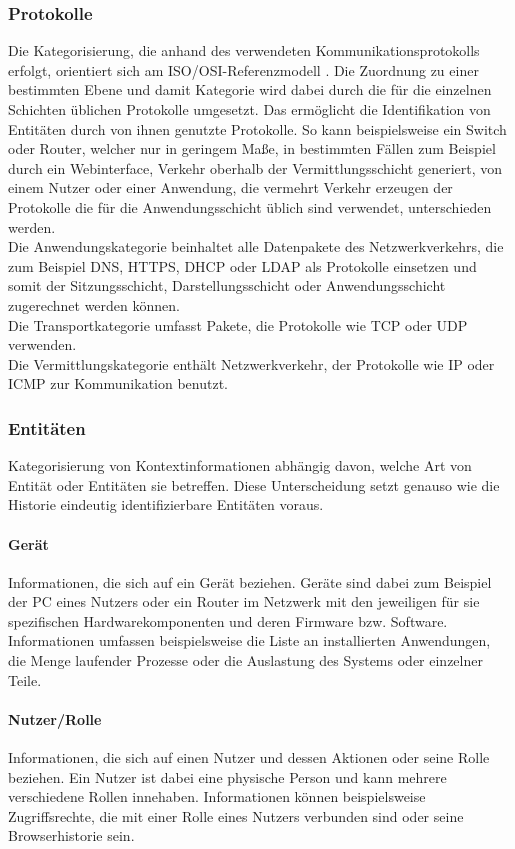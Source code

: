 \subsubsection{Protokolle}
Die Kategorisierung, die anhand des verwendeten Kommunikationsprotokolls erfolgt, orientiert sich am ISO/OSI-Referenzmodell \cite{day1983osi}. Die Zuordnung zu einer bestimmten Ebene und damit Kategorie wird dabei durch die für die einzelnen Schichten üblichen Protokolle umgesetzt. Das ermöglicht die Identifikation von Entitäten durch von ihnen genutzte Protokolle. So kann beispielsweise ein Switch oder Router, welcher nur in geringem Maße, in bestimmten Fällen zum Beispiel durch ein Webinterface, Verkehr oberhalb der Vermittlungsschicht generiert, von einem Nutzer oder einer Anwendung, die vermehrt Verkehr erzeugen der Protokolle die für die Anwendungsschicht üblich sind verwendet, unterschieden werden.\\Die Anwendungskategorie beinhaltet alle Datenpakete des Netzwerkverkehrs, die zum Beispiel DNS, HTTPS, DHCP oder LDAP als Protokolle einsetzen und somit der Sitzungsschicht, Darstellungsschicht oder Anwendungsschicht zugerechnet werden können.\\Die Transportkategorie umfasst Pakete, die Protokolle wie TCP oder UDP verwenden.\\Die Vermittlungskategorie enthält Netzwerkverkehr, der Protokolle wie IP oder ICMP zur Kommunikation benutzt.
\subsubsection{Entitäten}
Kategorisierung von Kontextinformationen abhängig davon, welche Art von Entität oder Entitäten sie betreffen. Diese Unterscheidung setzt genauso wie die Historie eindeutig identifizierbare Entitäten voraus.
\paragraph{Gerät}
Informationen, die sich auf ein Gerät beziehen. Geräte sind dabei zum Beispiel der PC eines Nutzers oder ein Router im Netzwerk mit den jeweiligen für sie spezifischen Hardwarekomponenten und deren Firmware bzw. Software. Informationen umfassen beispielsweise die Liste an installierten Anwendungen, die Menge laufender Prozesse oder die Auslastung des Systems oder einzelner Teile.
\paragraph{Nutzer/Rolle}
Informationen, die sich auf einen Nutzer und dessen Aktionen oder seine Rolle beziehen. Ein Nutzer ist dabei eine physische Person und kann mehrere verschiedene Rollen innehaben. Informationen können beispielsweise Zugriffsrechte, die mit einer Rolle eines Nutzers verbunden sind oder seine Browserhistorie sein.
